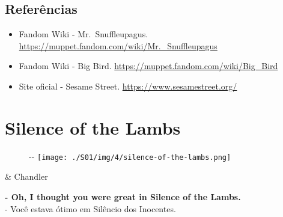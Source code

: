 \hypertarget{referuxeancias-4}{%
\subsection{Referências}\label{referuxeancias-4}}

\begin{itemize}
\tightlist
\item
  \sloppy Fandom Wiki - Mr. Snuffleupagus. \url{https://muppet.fandom.com/wiki/Mr._Snuffleupagus}
\item
  \sloppy Fandom Wiki - Big Bird. \url{https://muppet.fandom.com/wiki/Big_Bird}
\item
  \sloppy Site oficial - Sesame Street. \url{https://www.sesamestreet.org/}
\end{itemize}

\hypertarget{silence-of-the-lambs}{%
\section{Silence of the Lambs}\label{silence-of-the-lambs}}

\begin{figure}[!ht]
  \begin{adjustwidth}{-\oddsidemargin-1in}{-\rightmargin}
    \centering
    \texttt{[image: ./S01/img/4/silence-of-the-lambs.png]}
  \end{adjustwidth}
\end{figure}

\begin{tcolorbox}[enhanced,center upper,
    drop fuzzy shadow southeast, boxrule=0.3pt,
    lower separated=false, breakable,
    colframe=black!30!dialogoBorder,colback=white]
\begin{minipage}[c]{0.16\linewidth}
   & \centering \scriptsize{Chandler}
\end{minipage}
\hfill
\begin{minipage}[c]{0.8\linewidth}
  \textbf{- Oh, I thought you were great in Silence of the Lambs.}\\
  - Você estava ótimo em Silêncio dos Inocentes.
\end{minipage}
\end{tcolorbox}

